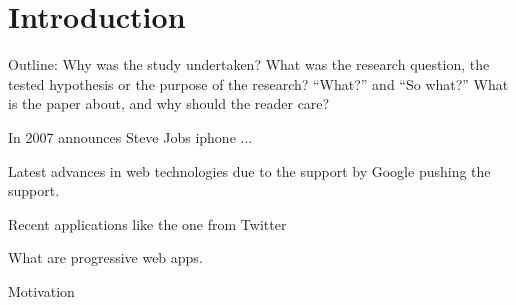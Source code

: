 \chapter{Introduction}

Outline: Why was the study undertaken?
What was the research question, the tested hypothesis or the purpose of the research?
“What?” and “So what?” What is the paper
about, and why should the reader care?

In 2007 announces Steve Jobs iphone ...

Latest advances in web technologies due to the support by Google pushing the support.

Recent applications like the one from Twitter

What are progressive web apps.

Motivation
\cite{liebelProgressiveWebApps2019}
